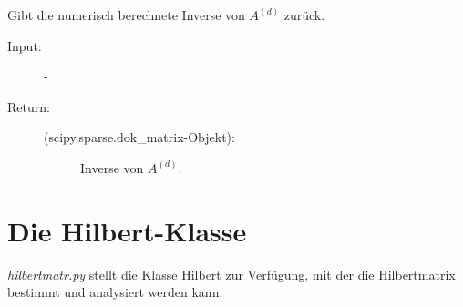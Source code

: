 \documentclass[letterpaper,10pt,ngerman, oneside, openright]{sphinxmanual}
\begin{document}
\begin{fulllineitems}
\begin{fulllineitems}
\begin{description}
\begin{description}
\end{description}

\end{description}

\end{fulllineitems}


\begin{fulllineitems}
\label{\detokenize{index:sparse_erw.Sparse.return_mat_d_inv}}
Gibt die numerisch berechnete Inverse von $A^{(d)}$ zurück.

\begin{description}
\item [{Input:}] -
\end{description}
\begin{description}
\item[{Return:}] \leavevmode\begin{description}
\item[{(scipy.sparse.dok\_matrix-Objekt):}] \leavevmode
Inverse von $A^{(d)}$.

\end{description}

\end{description}

\end{fulllineitems}


\end{fulllineitems}

\section{Die Hilbert-Klasse}

\label{\detokenize{index:module-hilbertmatr}}
\textit{hilbertmatr.py} stellt die Klasse Hilbert zur Verfügung, mit der die Hilbertmatrix bestimmt und
analysiert werden kann.
\end{document}
